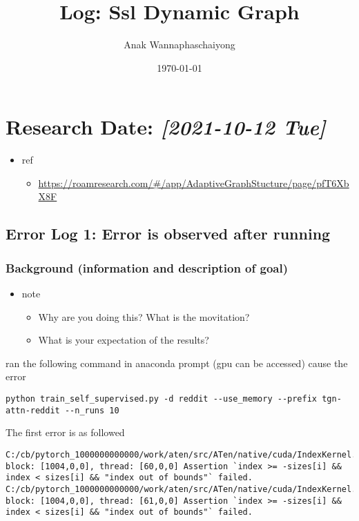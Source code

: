 \documentclass[11pt]{article}
\author{Anak Wannaphaschaiyong}
\date{\today}
\title{Log: Ssl Dynamic Graph}
\begin{document}
\maketitle
\tableofcontents


\section{Research Date: \textit{[2021-10-12 Tue]}}
\label{sec:org2660051}
\begin{itemize}
\item ref
\begin{itemize}
\item \url{https://roamresearch.com/\#/app/AdaptiveGraphStucture/page/pfT6XbX8F}
\end{itemize}
\end{itemize}
\subsection{Error Log 1: Error is observed after running}
\label{sec:orgc5581ff}
\subsubsection{Background (information and description of goal)}
\label{sec:orgf3ba68f}
\begin{itemize}
\item note
\begin{itemize}
\item Why are you doing this? What is the movitation?
\item What is your expectation of the results?
\end{itemize}
\end{itemize}
ran the following command in anaconda prompt (gpu can be accessed) cause the error
\begin{verbatim}
python train_self_supervised.py -d reddit --use_memory --prefix tgn-attn-reddit --n_runs 10
\end{verbatim}

The first error is as followed
\begin{verbatim}
C:/cb/pytorch_1000000000000/work/aten/src/ATen/native/cuda/IndexKernel.cu:142: block: [1004,0,0], thread: [60,0,0] Assertion `index >= -sizes[i] && index < sizes[i] && "index out of bounds"` failed.
C:/cb/pytorch_1000000000000/work/aten/src/ATen/native/cuda/IndexKernel.cu:142: block: [1004,0,0], thread: [61,0,0] Assertion `index >= -sizes[i] && index < sizes[i] && "index out of bounds"` failed.
\end{verbatim}
\end{document}

